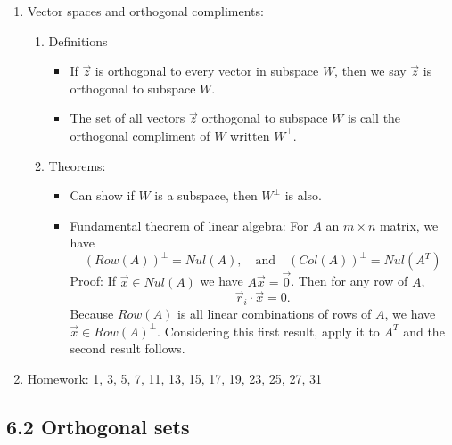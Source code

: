 \documentclass{article}
\begin{document}
\begin{enumerate}
\item Vector spaces and orthogonal compliments:
\begin{enumerate}
\item Definitions
\begin{itemize}
\item If $\vec{z}$ is orthogonal to every vector in subspace $W$, then we say $\vec{z}$ is orthogonal to subspace $W$.
\item The set of all vectors $\vec{z}$ orthogonal to subspace $W$ is call the orthogonal compliment of $W$ written $W^{\perp}$.
\end{itemize}
\item Theorems: 
\begin{itemize}
\item Can show if $W$ is a subspace, then $W^{\perp}$ is also. 
\item Fundamental theorem of linear algebra: For $A$ an $m \times n$ matrix, we have
\[
(Row(A))^{\perp} = Nul(A), \quad \text{and} \quad (Col(A))^{\perp}= Nul(A^T)
\]
Proof: If $\vec{x} \in Nul(A)$ we have $A\vec{x} = \vec{0}$. Then for any row of $A$, 
\[
\vec{r}_i \cdot \vec{x} = 0.
\]
Because $Row(A)$ is all linear combinations of rows of $A$, we have $\vec{x} \in Row(A)^{\perp}$. Considering this first result, apply it to $A^T$ and the second result follows.
\end{itemize}
\end{enumerate}

\item Homework: 1, 3, 5, 7, 11, 13, 15, 17, 19, 23, 25, 27, 31 

\end{enumerate}

\subsection{6.2 Orthogonal sets}
\end{document}
